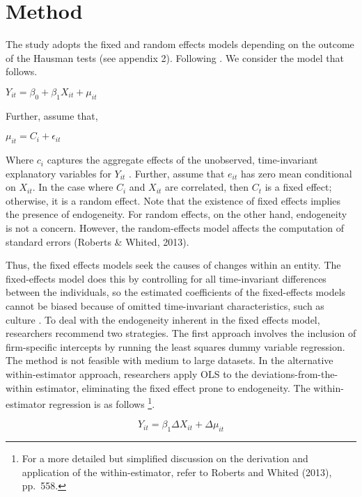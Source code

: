 \documentclass[a4paper,nobind]{templates/ociamthesis}
\begin{document}
\hypertarget{method}{%
\section{Method}\label{method}}

The study adopts the fixed and random effects models depending on the outcome of the Hausman tests (see appendix 2). Following \textcite{roberts2013endogeneity}. We consider the model that follows.

\(Y_{it} = \beta_{0} + \beta_{1}X_{it} + \mu_{it}\)

Further, assume that,

\(\mu_{it} = C_{i} + \epsilon_{it}\)

Where \(c_{i}\) captures the aggregate effects of the unobserved, time-invariant explanatory variables for \(Y_{it}\) . Further, assume that \(e_{it}\) has zero mean conditional on \(X_{it}\). In the case where \(C_{i}\) and \(X_{it}\) are correlated, then \(C_{t}\) is a fixed effect; otherwise, it is a random effect. Note that the existence of fixed effects implies the presence of endogeneity. For random effects, on the other hand, endogeneity is not a concern. However, the random-effects model affects the computation of standard errors (Roberts \& Whited, 2013).

Thus, the fixed effects models seek the causes of changes within an entity. The fixed-effects model does this by controlling for all time-invariant differences between the individuals, so the estimated coefficients of the fixed-effects models cannot be biased because of omitted time-invariant characteristics, such as culture \autocite{torres2007panel}. To deal with the endogeneity inherent in the fixed effects model, researchers recommend two strategies. The first approach involves the inclusion of firm-specific intercepts by running the least squares dummy variable regression. The method is not feasible with medium to large datasets. In the alternative within-estimator approach, researchers apply OLS to the deviations-from-the-within estimator, eliminating the fixed effect prone to endogeneity. The within-estimator regression is as follows \footnote{For a more detailed but simplified discussion on the derivation and application of the within-estimator, refer to Roberts and Whited (2013), pp.~558.}.

\begin{equation}
Y_{it} = \beta_{1} \Delta X_{it} + \Delta \mu_{it}
\end{equation}
\end{document}
